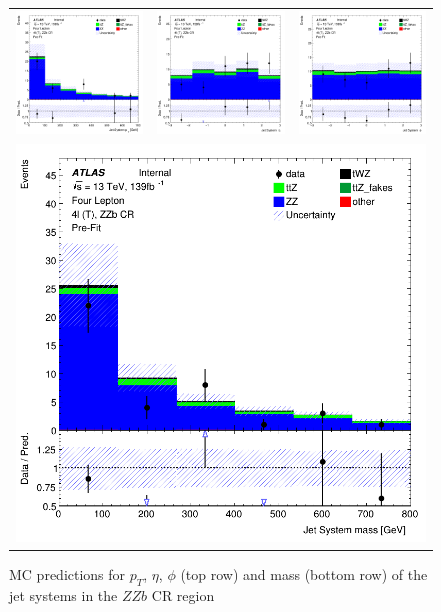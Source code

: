 \begin{figure}[htbp]
\centering
  \begin{tabular}{ccc}

    \includegraphics[width=.2\textwidth]{figures/PreFitPlots/lep4_ZZb_4T_Jet_sys_Pt}&
    \includegraphics[width=.2\textwidth]{figures/PreFitPlots/lep4_ZZb_4T_Jet_sys_Eta} &
    \includegraphics[width=.2\textwidth]{figures/PreFitPlots/lep4_ZZb_4T_Jet_sys_Phi} \\
    \multicolumn{3}{c}{\includegraphics[width=.2\textwidth]{figures/PreFitPlots/lep4_ZZb_4T_Jet_sys_mass}}

  \end{tabular}
  \caption{MC predictions for $p_{T}$, $\eta$, $\phi$ (top row) and mass (bottom row) of the jet systems in the $ZZb$ CR region }
  \label{fig:4lep-ZZb-CR-jet-sys-Plots}
\end{figure}

